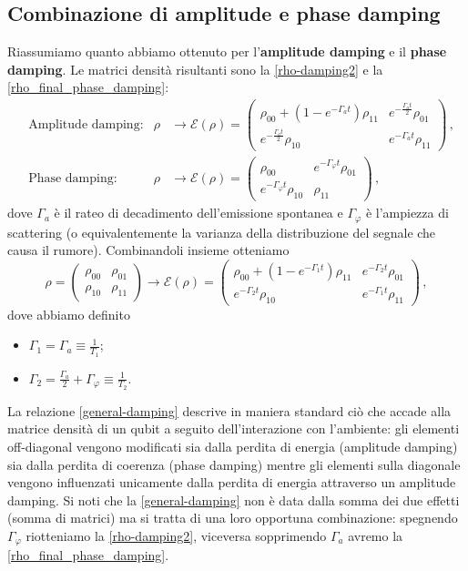 \subsection{Combinazione di amplitude e phase damping}
Riassumiamo quanto abbiamo ottenuto per l'\textbf{amplitude damping} e il \textbf{phase damping}. Le matrici densità risultanti sono la \eqref{rho-damping2} e la \eqref{rho_final_phase_damping}:
\begin{align*}
    &\text{Amplitude damping}: &\rho &\rightarrow \mathcal{E}(\rho) =
    \begin{pmatrix}
        \rho_{00}+(1-e^{-\Gamma_a t})\rho_{11} & e^{-\frac{\Gamma_a t}{2}} \rho_{01} \\          e^{-\frac{\Gamma_a t}{2}} \rho_{10} & e^{-\Gamma_a t}\rho_{11}         
    \end{pmatrix} \, , \\
    &\text{Phase damping}: &\rho &\rightarrow \mathcal{E}(\rho) =
    \begin{pmatrix}
        \rho_{00} & e^{-\Gamma_\varphi t}\rho_{01} \\
        e^{-\Gamma_\varphi t}\rho_{10} & \rho_{11}
    \end{pmatrix} \, ,
\end{align*}
dove $\Gamma_a$ è il rateo di decadimento dell'emissione spontanea e $\Gamma_\varphi$ è l'ampiezza di scattering (o equivalentemente la varianza della distribuzione del segnale che causa il rumore). Combinandoli insieme otteniamo
\begin{equation}\label{general-damping}
    \rho =
    \begin{pmatrix}
        \rho_{00} & \rho_{01} \\ \rho_{10} & \rho_{11}
    \end{pmatrix}
    \rightarrow \mathcal{E}(\rho) =
    \begin{pmatrix}
        \rho_{00}+(1-e^{-\Gamma_1 t})\rho_{11} & e^{-\Gamma_2 t}\rho_{01} \\
        e^{-\Gamma_2 t}\rho_{10} & e^{-\Gamma_1 t}\rho_{11}
    \end{pmatrix} \, ,
\end{equation}
dove abbiamo definito
\begin{itemize}
    \item $\Gamma_1=\Gamma_a \equiv \frac 1 {T_1}$;
    \item $\Gamma_2 = \frac {\Gamma_a} 2 + \Gamma_\varphi \equiv \frac 1 {T_2}$.
\end{itemize}
La relazione \eqref{general-damping} descrive in maniera standard ciò che accade alla matrice densità di un qubit a seguito dell'interazione con l'ambiente: gli elementi off-diagonal vengono modificati sia dalla perdita di energia (amplitude damping) sia dalla perdita di coerenza (phase damping) mentre gli elementi sulla diagonale vengono influenzati unicamente dalla perdita di energia attraverso un amplitude damping. Si noti che la \eqref{general-damping} non è data dalla somma dei due effetti (somma di matrici) ma si tratta di una loro opportuna combinazione: spegnendo $\Gamma_\varphi$ riotteniamo la \eqref{rho-damping2}, viceversa sopprimendo $\Gamma_a$ avremo la \eqref{rho_final_phase_damping}. 